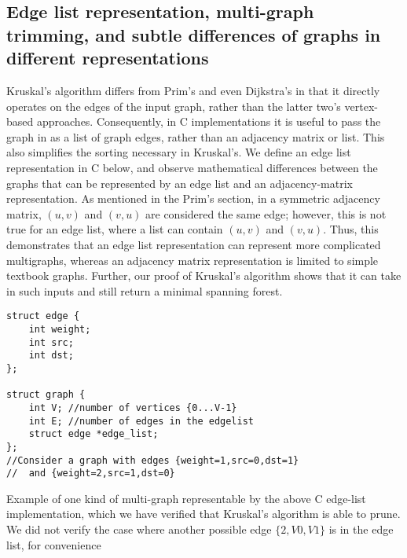 \subsection{Edge list representation, multi-graph trimming, and subtle differences of graphs in different representations}
Kruskal's algorithm differs from Prim's and even Dijkstra's in that it directly operates on the edges of the input graph, rather than the latter two's vertex-based approaches. Consequently, in C implementations it is useful to pass the graph in as a list of graph edges, rather than an adjacency matrix or list. This also simplifies the sorting necessary in Kruskal's.
\newline\newline
We define an edge list representation in C below, and observe mathematical differences between the graphs that can be represented by an edge list and an adjacency-matrix representation. As mentioned in the Prim's section, in a symmetric adjacency matrix, $(u,v)$ and $(v,u)$ are considered the same edge; however, this is not true for an edge list, where a list can contain $(u,v)$ and $(v,u)$. Thus, this demonstrates that an edge list representation can represent more complicated multigraphs, whereas an adjacency matrix representation is limited to simple textbook graphs. Further, our proof of Kruskal's algorithm shows that it can take in such inputs and still return a minimal spanning forest.
\newline
\begin{lstlisting}
struct edge {
	int weight;
	int src;
	int dst;
};

struct graph {
	int V; //number of vertices {0...V-1}
	int E; //number of edges in the edgelist
	struct edge *edge_list;
};
//Consider a graph with edges {weight=1,src=0,dst=1}
//	and {weight=2,src=1,dst=0}
\end{lstlisting}
\begin{center}
\end{center}
\begin{center}
Example of one kind of multi-graph representable by the above C edge-list implementation, which we have verified that Kruskal's algorithm is able to prune. We did not verify the case where another possible edge $\{2,V0,V1\}$ is in the edge list, for convenience
\end{center}


